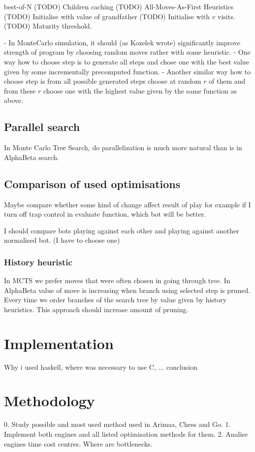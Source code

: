 \documentclass[12pt,titlepage,fleqn]{report}
\begin{document}
best-of-N (TODO)
Children caching (TODO)
All-Moves-As-First Heuristics (TODO)
Initialise with value of grandfather (TODO)
Initialise with $v$ visits. (TODO)
Maturity threshold.

- In MonteCarlo simulation, it should (as Kozelek wrote) significantly improve
  strength of program by choosing random moves rather with some heuristic.
	- One way how to choose step is to generate all steps and chose one with
	  the best value given by some incrementally precomputed function.
	- Another similar way how to choose step is from all possible generated
	  steps choose at random $r$ of them and from these $r$ choose one with the
	  highest value given by the same function as above.

\section{Parallel search}
In Monte Carlo Tree Search, do parallelization is much more natural than is in
AlphaBeta search.

\section{Comparison of used optimisations}
Maybe compare whether some kind of change affect result of play
for example if I turn off trap control in evaluate function, which bot will be
better.

I should compare bots playing against each other and playing against another
normalised bot. (I have to choose one)

\subsection{History heuristic}
In MCTS we prefer moves that were often chosen in going through tree. In
AlphaBeta value of move is increasing when branch using selected step is
pruned. Every time we order branches of the search tree by value given by
history heuristics. This approach should increase amount of pruning.


\chapter{Implementation}
Why i used haskell, where was necessary to use C, ... conclusion

\chapter{Methodology}
0. Study possible and most used method used in Arimaa, Chess and Go.
1. Implement both engines and all listed optimisation methods for them.
2. Analise engines time cost centres. Where are bottlenecks.
\end{document}
